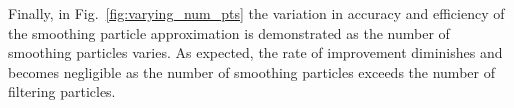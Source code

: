 \documentclass[peerreview,11pt,draftcls,onecolumn]{IEEEtran}
\begin{document}
%
%
%
%
Finally, in Fig.~\ref{fig:varying_num_pts} the variation in accuracy and efficiency of the smoothing particle approximation is demonstrated as the number of smoothing particles varies. As expected, the rate of improvement diminishes and becomes negligible as the number of smoothing particles exceeds the number of filtering particles.
%
\end{document}
